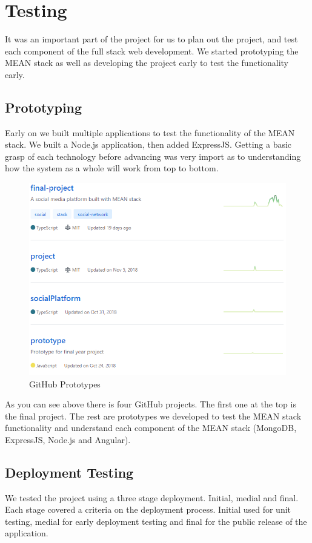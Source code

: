 \section{Testing}
It was an important part of the project for us to plan out the project, and test each component of the full stack web development. We started prototyping the MEAN stack as well as developing the project early to test the functionality early.

\subsection{Prototyping}
Early on we built multiple applications to test the functionality of the MEAN stack. We built a Node.js application, then added ExpressJS. Getting a basic grasp of each technology before advancing was very import as to understanding how the system as a whole will work from top to bottom.

\begin{figure}[H]
  \includegraphics[width=\linewidth]{img/prototypes.PNG}
  \caption{GitHub Prototypes}
  \label{fig:GHP}
\end{figure}

As you can see above there is four GitHub projects. The first one at the top is the final project. The rest are prototypes we developed to test the MEAN stack functionality and understand each component of the MEAN stack (MongoDB, ExpressJS, Node.js and Angular).

\subsection{Deployment Testing}
We tested the project using a three stage deployment. Initial, medial and final. Each stage covered a criteria on the deployment process. Initial used for unit testing, medial for early deployment testing and final for the public release of the application.

